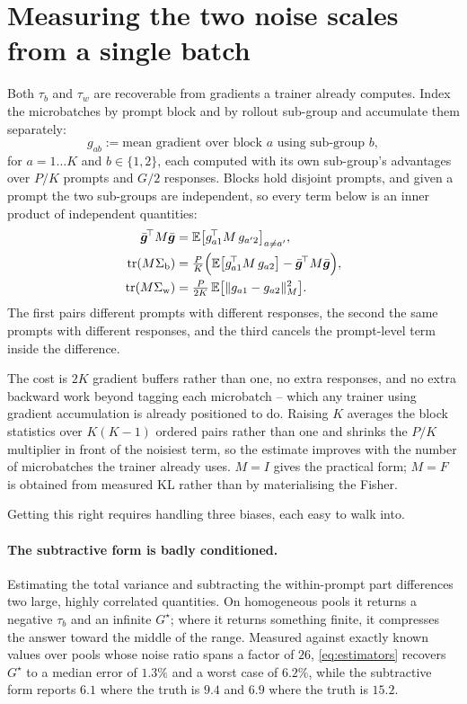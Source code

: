 \section{Measuring the two noise scales from a single batch}
\label{sec:estimation}

Both $\tau_b$ and $\tau_w$ are recoverable from gradients a trainer already computes. Index the
microbatches by prompt block and by rollout sub-group and accumulate them separately:
\begin{equation}
  \label{eq:cells}
  g_{ab} := \text{mean gradient over block } a \text{ using sub-group } b,
\end{equation}
for $a = 1 \dots K$ and $b \in \{1,2\}$, each computed with its own sub-group's advantages over
$P/K$ prompts and $G/2$ responses.
Blocks hold disjoint prompts, and given a prompt the two sub-groups are independent, so every term
below is an inner product of independent quantities:
\begin{align}
  \label{eq:estimators}
  \bar{\bm{g}}^{\!\top} M \bar{\bm{g}} &= \mathbb{E}\big[ g_{a1}^{\!\top} M\, g_{a'2} \big]_{a \neq a'}, \\
  \operatorname{tr}(M\Sigma_{\mathrm{b}}) &= \tfrac{P}{K}\Big( \mathbb{E}\big[ g_{a1}^{\!\top} M\, g_{a2} \big]
     - \bar{\bm{g}}^{\!\top} M \bar{\bm{g}} \Big), \notag \\
  \operatorname{tr}(M\Sigma_{\mathrm{w}}) &= \tfrac{P}{2K}\, \mathbb{E}\big[ \| g_{a1} - g_{a2} \|_M^2 \big]. \notag
\end{align}
The first pairs different prompts with different responses, the second the same prompts with
different responses, and the third cancels the prompt-level term inside the difference.

The cost is $2K$ gradient buffers rather than one, no extra responses, and no extra backward work
beyond tagging each microbatch -- which any trainer using gradient accumulation is already
positioned to do. Raising $K$ averages the block statistics over $K(K-1)$ ordered pairs rather than
one and shrinks the $P/K$ multiplier in front of the noisiest term, so the estimate improves with
the number of microbatches the trainer already uses. $M = I$ gives the practical form; $M = F$ is
obtained from measured KL rather than by materialising the Fisher.

Getting this right requires handling three biases, each easy to walk into.

\paragraph{The subtractive form is badly conditioned.} Estimating the total variance and
subtracting the within-prompt part differences two large, highly correlated quantities. On
homogeneous pools it returns a negative $\tau_b$ and an infinite $G^{\star}$; where it returns something
finite, it compresses the answer toward the middle of the range. Measured against exactly known
values over pools whose noise ratio spans a factor of $26$, \eqref{eq:estimators} recovers $G^{\star}$
to a median error of $1.3\%$ and a worst case of $6.2\%$, while the subtractive form reports
$6.1$ where the truth is $9.4$ and $6.9$ where the truth is $15.2$.

